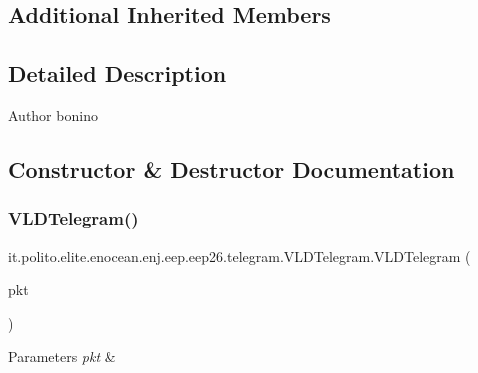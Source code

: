 \subsection*{Additional Inherited Members}


\subsection{Detailed Description}
\begin{DoxyAuthor}{Author}
bonino 
\end{DoxyAuthor}


\subsection{Constructor \& Destructor Documentation}
\hypertarget{classit_1_1polito_1_1elite_1_1enocean_1_1enj_1_1eep_1_1eep26_1_1telegram_1_1_v_l_d_telegram_ac25fd48a7deda22319e29ba018e27568}{}\label{classit_1_1polito_1_1elite_1_1enocean_1_1enj_1_1eep_1_1eep26_1_1telegram_1_1_v_l_d_telegram_ac25fd48a7deda22319e29ba018e27568} 
\subsubsection{\texorpdfstring{V\+L\+D\+Telegram()}{VLDTelegram()}}
{\footnotesize\ttfamily it.\+polito.\+elite.\+enocean.\+enj.\+eep.\+eep26.\+telegram.\+V\+L\+D\+Telegram.\+V\+L\+D\+Telegram (\begin{DoxyParamCaption}\item[{\hyperlink{classit_1_1polito_1_1elite_1_1enocean_1_1protocol_1_1serial_1_1v3_1_1network_1_1packet_1_1_e_s_p3_packet}{E\+S\+P3\+Packet}}]{pkt }\end{DoxyParamCaption})}


\begin{DoxyParams}{Parameters}
{\em pkt} & \\
\hline
\end{DoxyParams}


